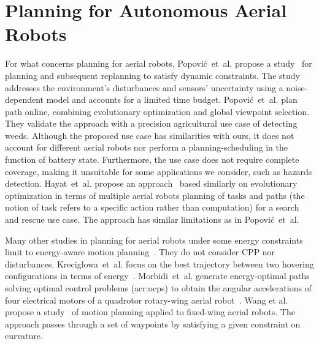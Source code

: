 \section{Planning for Autonomous Aerial Robots}
\label{sec:soa-aerial-pl}

For what concerns planning for aerial robots, Popovi\'{c}~et~al. propose a study~\citep{popovic2017online} for planning and subsequent replanning to satisfy dynamic constraints. The study addresses the environment's disturbances and sensors' uncertainty using a noise-dependent model and accounts for a limited time budget. Popovi\'{c}~et~al. plan path online, combining evolutionary optimization and global viewpoint selection. They validate the approach with a precision agricultural use case of detecting weeds. Although the proposed use case has similarities with ours, it does not account for different aerial robots nor perform a planning-scheduling in the function of battery state. Furthermore, the use case does not require complete coverage, making it unsuitable for some applications we consider, such as hazards detection. Hayat~et~al. propose an approach~\citep{hayat2017multi} based similarly on evolutionary optimization in terms of multiple aerial robots planning of tasks and paths (the notion of task refers to a specific action rather than computation) for a search and rescue use case. The approach has similar limitations as in Popovi\'{c}~et~al.

Many other studies in planning for aerial robots under some energy constraints limit to energy-aware motion planning~\citep{wang2017curvature,morbidi2016minimum,kreciglowa2017energy}. They do not consider CPP nor disturbances. Kreciglowa~et~al. focus on the best trajectory between two hovering configurations in terms of energy~\citep{kreciglowa2017energy}. Morbidi~et~al. generate energy-optimal paths solving optimal control problems (\Gls{acr:ocp}s) to obtain the angular accelerations of four electrical motors of a quadrotor rotary-wing aerial robot~\citep{morbidi2016minimum}. 
Wang et al. propose a study~\citep{wang2017curvature} of motion planning applied to fixed-wing aerial robots. The approach passes through a set of waypoints by satisfying a given constraint on curvature.

